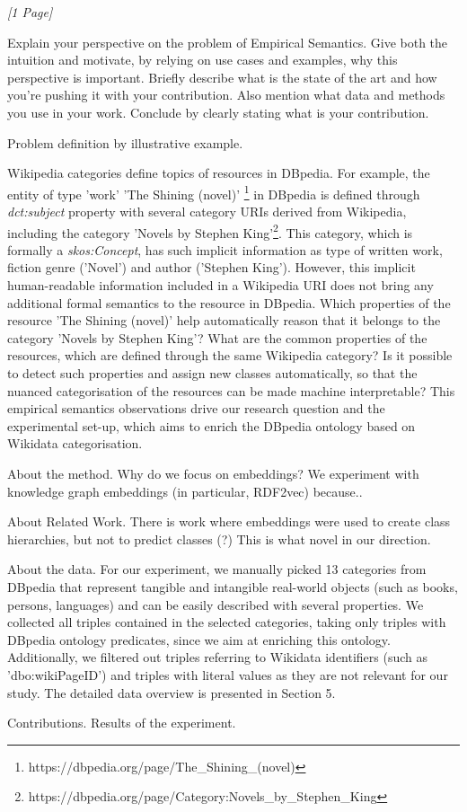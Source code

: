 \textit{[1 Page]}

\noindent
Explain your perspective on the problem of Empirical Semantics. 
Give both the intuition and motivate, by relying on use cases and examples, why this perspective is important. 
Briefly describe what is the state of the art and how you’re pushing it with your contribution. 
Also mention what data and methods you use in your work. 
Conclude by clearly stating what is your contribution.

Problem definition by illustrative example.

Wikipedia categories define topics of resources in DBpedia.
For example, the entity of type 'work' 'The Shining (novel)' \footnote{https://dbpedia.org/page/The\_Shining\_(novel)} in DBpedia is defined through \textit{dct:subject} property with several category URIs derived from Wikipedia, including the category 'Novels by Stephen King'\footnote{https://dbpedia.org/page/Category:Novels\_by\_Stephen\_King}.
This category, which is formally a \textit{skos:Concept}, has such implicit information as type of written work, fiction genre ('Novel') and author ('Stephen King').
However, this implicit human-readable information included in a Wikipedia URI does not bring any additional formal semantics to the resource in DBpedia.
Which properties of the resource 'The Shining (novel)' help automatically reason that it belongs to the category 'Novels by Stephen King'?
What are the common properties of the resources, which are defined through the same Wikipedia category?
Is it possible to detect such properties and assign new classes automatically, so that the nuanced categorisation of the resources can be made machine interpretable?
This empirical semantics observations drive our research question and the experimental set-up, which aims to enrich the DBpedia ontology based on Wikidata categorisation. 

About the method.
Why do we focus on embeddings?
We experiment with knowledge graph embeddings (in particular, RDF2vec) because..

About Related Work.
There is work where embeddings were used to create class hierarchies, but not to predict classes (?)
This is what novel in our direction.

About the data.
For our experiment, we manually picked 13 categories from DBpedia that represent tangible and intangible real-world objects (such as books, persons, languages) and can be easily described with several properties.
We collected all triples contained in the selected categories, taking only triples with DBpedia ontology predicates, since we aim at enriching this ontology.
Additionally, we filtered out triples referring to Wikidata identifiers (such as 'dbo:wikiPageID') and triples with literal values as they are not relevant for our study.
The detailed data overview is presented in Section 5.

Contributions.
Results of the experiment.